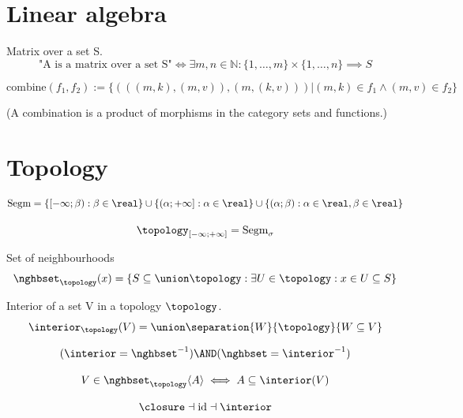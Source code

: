 \def\topic{}


\section{Linear algebra}
\begin{definition}Matrix over a set S.
\[
\mbox{"A is a matrix over a set S"}
\iff
\exists m, n \in \mathbb{N}: \{1,\dots,m\}\times \{1,\dots,n\} \implies S \]
\end{definition}

\begin{definition}
\[
\mbox{combine}(f_1,f_2) := \{(((m,k),(m,v)),(m,(k,v)))| (m,k)\in f_1 \land (m,v)\in f_2\}
\]
\end{definition}
(A combination is a product of morphisms in the category sets and functions.)

\section{Topology}
\begin{definition}
\[
\mbox{Segm} = \{[-\infty;\beta):\beta\in\real\}\cup \{(\alpha;+\infty]:\alpha\in\real\}\cup \{(\alpha;\beta):\alpha\in\real,\beta\in\real\}
\]
\end{definition}
\begin{definition}
\[
\topology_{[-\infty;+\infty]} = \mbox{Segm}_\sigma
\]
\end{definition}
\begin{definition}
Set of neighbourhoods
\[
\nghbset_\topology(x) = \{S \subseteq \union \topology : \exists  U\in \topology: x\in U \subseteq S \}
\]
\end{definition}
\begin{definition}
Interior of a set V in a topology $\topology$.
\[
\interior_\topology(V) = \union
\separation{W}{\topology}{W\subseteq V}
\]
\end{definition}
\begin{theorem}
\[
(\interior = \nghbset^{-1})\AND(\nghbset=\interior^{-1})
\]
\end{theorem}
\begin{theorem}
\[
V\in \nghbset_\topology\langle A\rangle \iff A \subseteq \interior(V)
\]
\end{theorem}
\begin{theorem}
\[
\closure \dashv \mbox{id} \dashv \interior
\]
\end{theorem}

